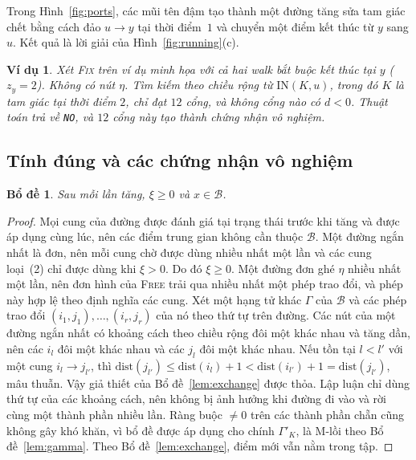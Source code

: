 \documentclass[pdflatex,sn-mathphys-num]{sn-jnl}
\theoremstyle{thmstyleone}%
\newtheorem{lemma}[theorem]{Bổ đề}%
\theoremstyle{thmstyletwo}%
\newtheorem{example}{Ví dụ}%
\theoremstyle{thmstylethree}%
\newcommand{\cB}{\mathcal{B}}
\newcommand{\IN}{\mathrm{IN}}
\newcommand{\FIX}{\textup{\textsc{Fix}}}
\newcommand{\FREE}{\textup{\textsc{Free}}}
\newcommand{\NO}{\texttt{NO}}
\begin{document}
Trong Hình~\ref{fig:ports}, các mũi tên đậm tạo thành một đường tăng sửa tam giác chết bằng cách đảo $u\to y$ tại thời điểm~$1$ và chuyển một điểm kết thúc từ $y$ sang $u$. Kết quả là lời giải của Hình~\ref{fig:running}(c).

\begin{example}\label{ex:fix}
Xét \FIX{} trên ví dụ minh họa với cả hai walk bắt buộc kết thúc tại $y$ ($z_y=2$). Không có nút $\eta$. Tìm kiếm theo chiều rộng từ $\IN(K,u)$, trong đó $K$ là tam giác tại thời điểm $2$, chỉ đạt $12$ cổng, và không cổng nào có $d<0$. Thuật toán trả về \NO{}, và $12$ cổng này tạo thành chứng nhận vô nghiệm.
\end{example}

\subsection{Tính đúng và các chứng nhận vô nghiệm}

\begin{lemma}\label{lem:invariant}
Sau mỗi lần tăng, $\xi\ge0$ và $x\in\cB$.
\end{lemma}

\begin{proof}
Mọi cung của đường được đánh giá tại trạng thái trước khi tăng và được áp dụng cùng lúc, nên các điểm trung gian không cần thuộc $\cB$. Một đường ngắn nhất là đơn, nên mỗi cung chờ được dùng nhiều nhất một lần và các cung loại~(2) chỉ được dùng khi $\xi>0$. Do đó $\xi\ge0$. Một đường đơn ghé $\eta$ nhiều nhất một lần, nên đơn hình của \FREE{} trải qua nhiều nhất một phép trao đổi, và phép này hợp lệ theo định nghĩa các cung. Xét một hạng tử khác $\Gamma$ của $\cB$ và các phép trao đổi $(i_1,j_1),\dots,(i_r,j_r)$ của nó theo thứ tự trên đường. Các nút của một đường ngắn nhất có khoảng cách theo chiều rộng đôi một khác nhau và tăng dần, nên các $i_l$ đôi một khác nhau và các $j_l$ đôi một khác nhau. Nếu tồn tại $l<l'$ với một cung $i_l\to j_{l'}$, thì $\mathrm{dist}(j_{l'})\le\mathrm{dist}(i_l)+1<\mathrm{dist}(i_{l'})+1=\mathrm{dist}(j_{l'})$, mâu thuẫn. Vậy giả thiết của Bổ đề~\ref{lem:exchange} được thỏa. Lập luận chỉ dùng thứ tự của các khoảng cách, nên không bị ảnh hưởng khi đường đi vào và rời cùng một thành phần nhiều lần. Ràng buộc $\ne0$ trên các thành phần chẵn cũng không gây khó khăn, vì bổ đề được áp dụng cho chính $\Gamma'_K$, là M-lồi theo Bổ đề~\ref{lem:gamma}. Theo Bổ đề~\ref{lem:exchange}, điểm mới vẫn nằm trong tập.
\end{proof}
\end{document}
